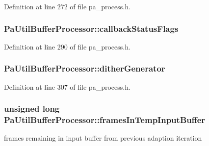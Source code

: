 Definition at line 272 of file pa\+\_\+process.\+h.

\subsubsection[{\texorpdfstring{callback\+Status\+Flags}{callbackStatusFlags}}]{ Pa\+Util\+Buffer\+Processor\+::callback\+Status\+Flags}\hypertarget{struct_pa_util_buffer_processor_a269d950005d05b2c15d13d0e643c936e}{}\label{struct_pa_util_buffer_processor_a269d950005d05b2c15d13d0e643c936e}


Definition at line 290 of file pa\+\_\+process.\+h.

\subsubsection[{\texorpdfstring{dither\+Generator}{ditherGenerator}}]{ Pa\+Util\+Buffer\+Processor\+::dither\+Generator}\hypertarget{struct_pa_util_buffer_processor_a113fbcc8dab47dc9eb29b9541520084b}{}\label{struct_pa_util_buffer_processor_a113fbcc8dab47dc9eb29b9541520084b}


Definition at line 307 of file pa\+\_\+process.\+h.

\subsubsection[{\texorpdfstring{frames\+In\+Temp\+Input\+Buffer}{framesInTempInputBuffer}}]{\setlength{\rightskip}{0pt plus 5cm}unsigned long Pa\+Util\+Buffer\+Processor\+::frames\+In\+Temp\+Input\+Buffer}\hypertarget{struct_pa_util_buffer_processor_a8b1a7ccf36beec18977244c4dd9c6af2}{}\label{struct_pa_util_buffer_processor_a8b1a7ccf36beec18977244c4dd9c6af2}
frames remaining in input buffer from previous adaption iteration 

